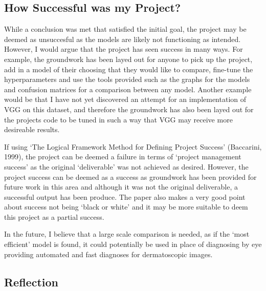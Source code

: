\documentclass[11pt]{article}
\begin{document}
    \hypertarget{how-successful-was-my-project}{%
\subsection{How Successful was my
Project?}\label{how-successful-was-my-project}}

While a conclusion was met that satisfied the initial goal, the project
may be deemed as unsuccesful as the models are likely not functioning as
intended. However, I would argue that the project has seen success in
many ways. For example, the groundwork has been layed out for anyone to
pick up the project, add in a model of their choosing that they would
like to compare, fine-tune the hyperparameters and use the tools
provided such as the graphs for the models and confusion matrices for a
comparison between any model. Another example would be that I have not
yet discovered an attempt for an implementation of VGG on this dataset,
and therefore the groundwork has also been layed out for the projects
code to be tuned in such a way that VGG may receive more desireable
results.

If using `The Logical Framework Method for Defining Project Success'
(Baccarini, 1999), the project can be deemed a failure in terms of
`project management success' as the original `deliverable' was not
achieved as desired. However, the project success can be deemed as a
success as groundwork has been provided for future work in this area and
although it was not the original deliverable, a successful output has
been produce. The paper also makes a very good point about success not
being `black or white' and it may be more suitable to deem this project
as a partial success.

In the future, I believe that a large scale comparison is needed, as if
the `most efficient' model is found, it could potentially be used in
place of diagnosing by eye providing automated and fast diagnoses for
dermatoscopic images.

    \hypertarget{reflection}{%
\subsection{Reflection}\label{reflection}}
\end{document}
